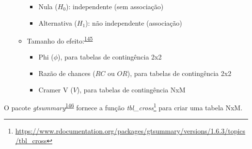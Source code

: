 \documentclass[
  a4paper,
]{book}
\renewcommand{\href}[2]{#2\footnote{\url{#1}}}
\newenvironment{infobox}[1]
  {
  \begin{itemize}
  \renewcommand{\labelitemi}{
    \raisebox{-.7\height}[0pt][0pt]{
      {\setkeys{Gin}{width=3em,keepaspectratio}
        \texttt{[image: \#1]}}
    }
  }
  \setlength{\fboxsep}{1em}
  \begin{blackbox}
  \item
  }
  {
  \end{blackbox}
  \end{itemize}
  }
\begin{document}
\begin{itemize}
\begin{itemize}
    \begin{itemize}
    \item
      Nula (\(H_{0}\)): independente (sem associação)
    \item
      Alternativa (\(H_{1}\)): não independente (associação)
    \end{itemize}
  \item
    Tamanho do efeito:\textsuperscript{\protect\hyperlink{ref-Kim2017a}{145}}

    \begin{itemize}
    \item
      Phi (\(\phi\)), para tabelas de contingência 2x2
    \item
      Razão de chances (\(RC\) ou \(OR\)), para tabelas de contingência 2x2
    \item
      Cramer V (\(V\)), para tabelas de contingência NxM
    \end{itemize}
  \end{itemize}
\end{itemize}

\begin{infobox}{images/Rlogo}
O pacote \emph{gtsummary}\textsuperscript{\protect\hyperlink{ref-gtsummary}{146}} fornece a função \href{https://www.rdocumentation.org/packages/gtsummary/versions/1.6.3/topics/tbl_cross}{\emph{tbl\_cross}} para criar uma tabela NxM.

\end{infobox}
\end{document}
